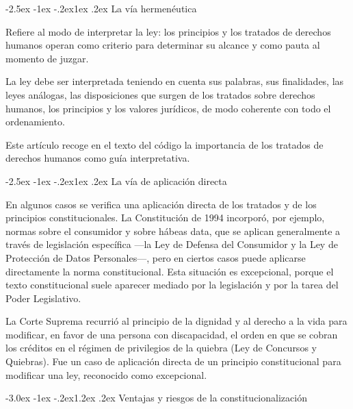 \documentclass[12pt,oneside]{book}
\makeatletter
\renewcommand\section{\@startsection{section}{1}{\z@}%
  {-3.0ex \@plus -1ex \@minus -.2ex}{1.2ex \@plus .2ex}%
  {\normalfont\large\bfseries\color{acento}}}
\renewcommand\subsection{\@startsection{subsection}{2}{\z@}%
  {-2.5ex \@plus -1ex \@minus -.2ex}{1ex \@plus .2ex}%
  {\normalfont\normalsize\bfseries}}
\makeatother
\begin{document}
\subsection{La vía hermenéutica}

Refiere al modo de interpretar la ley: los principios y los tratados de derechos humanos operan como criterio para determinar su alcance y como pauta al momento de juzgar.

\begin{regla}
La ley debe ser interpretada teniendo en cuenta sus palabras, sus finalidades, las leyes análogas, las disposiciones que surgen de los tratados sobre derechos humanos, los principios y los valores jurídicos, de modo coherente con todo el ordenamiento.
\end{regla}

Este artículo recoge en el texto del código la importancia de los tratados de derechos humanos como guía interpretativa.

\subsection{La vía de aplicación directa}

En algunos casos se verifica una aplicación directa de los tratados y de los principios constitucionales. La Constitución de 1994 incorporó, por ejemplo, normas sobre el consumidor y sobre hábeas data, que se aplican generalmente a través de legislación específica ---la Ley de Defensa del Consumidor y la Ley de Protección de Datos Personales---, pero en ciertos casos puede aplicarse directamente la norma constitucional. Esta situación es excepcional, porque el texto constitucional suele aparecer mediado por la legislación y por la tarea del Poder Legislativo.

\begin{ejemplo}
La Corte Suprema recurrió al principio de la dignidad y al derecho a la vida para modificar, en favor de una persona con discapacidad, el orden en que se cobran los créditos en el régimen de privilegios de la quiebra (Ley de Concursos y Quiebras). Fue un caso de aplicación directa de un principio constitucional para modificar una ley, reconocido como excepcional.
\end{ejemplo}

\section{Ventajas y riesgos de la constitucionalización}
\end{document}
